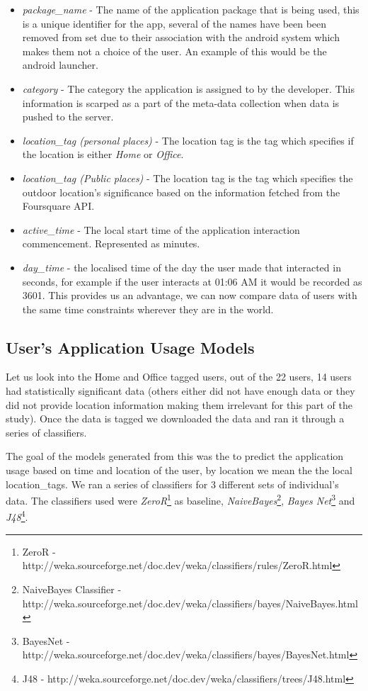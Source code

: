 \documentclass[prodmode,acmtecs]{acmsmall}
\begin{document}
\begin{itemize}
\item \textit{package\_name} - The name of the application package that is being used, this is a unique identifier for the app, several of the names have been been removed from set due to their association with the android system which makes them not a choice of the user. An example of this would be the android launcher.

\item \textit{category} - The category the application is assigned to by the developer. This information is scarped as a part of the meta-data collection when data is pushed to the server.

\item \textit{location\_tag (personal places)} - The location tag is the tag which specifies if the location is either \textit{Home} or \textit{Office}.

\item \textit{location\_tag (Public places)} - The location tag is the tag which specifies the outdoor location's significance based on the information fetched from the Foursquare API.

\item \textit{active\_time} - The local start time of the application interaction commencement. Represented as minutes.

\item \textit{day\_time} - the localised time of the day the user made that interacted in seconds, for example if the user interacts at 01:06 AM it would be recorded as 3601. This provides us an advantage, we can now compare data of users with the same time constraints wherever they are in the world.
\end{itemize}

\subsection{User's Application Usage Models}

Let us look into the Home and Office tagged users, out of the 22 users, 14 users had statistically significant data (others either did not have enough data or they did not provide location information making them irrelevant for this part of the study). Once the data is tagged we downloaded the data and ran it through a series of classifiers.

The goal of the models generated from this was the to predict the application usage based on time and location of the user, by location we mean the the local location\_tags. We ran a series of classifiers for 3 different sets of individual's data. The classifiers used were \textit{ZeroR}\footnote{ZeroR - http://weka.sourceforge.net/doc.dev/weka/classifiers/rules/ZeroR.html} as baseline, \textit{NaiveBayes}\footnote{NaiveBayes Classifier - http://weka.sourceforge.net/doc.dev/weka/classifiers/bayes/NaiveBayes.html}, \textit{Bayes Net}\footnote{BayesNet - http://weka.sourceforge.net/doc.dev/weka/classifiers/bayes/BayesNet.html} and \textit{J48}\footnote{J48 - http://weka.sourceforge.net/doc.dev/weka/classifiers/trees/J48.html}.
\end{document}
